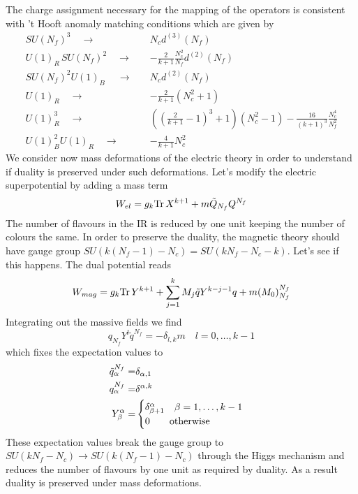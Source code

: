 The charge assignment necessary for the mapping of the operators is consistent with 't Hooft anomaly matching conditions which are given by
\begin{equation}
\begin{aligned}
SU(N_f)^3 \quad \longrightarrow \quad   & N_c d^{(3)}(N_f) \\
U(1)_R\, SU(N_f)^2 \quad \longrightarrow \quad  & -\frac{2}{k+1} \frac{N_c^2}{N_f} d^{(2)} (N_f) \\
SU(N_f)^2 U(1)_B\ \quad \longrightarrow \quad  & N_c d^{(2)}(N_f) \\
U(1)_R \quad \longrightarrow \quad  & - \frac{2}{k+1} (N_c^2 + 1) \\
U(1)_R^3 \quad \longrightarrow \quad  & \left( \left(\frac{2}{k+1} -1 \right)^3 +1 \right) (N_c^2-1) - \frac{16}{(k+1)^3} \frac{N_c^4}{N_f^2} \\
U(1)_B^2 U(1)_R \quad \longrightarrow \quad  & - \frac{4}{k+1} N_c^2
\end{aligned}
\end{equation}
We consider now mass deformations of the electric theory in order to understand if duality is preserved under such deformations.
Let's modify the electric superpotential by adding a mass term
\begin{equation}
W_{el} =  g_k \mathrm{Tr } \, X^{k+1} + m \tilde{Q}_{N_f} Q^{N_f}
\end{equation}
The number of flavours in the IR is reduced by one unit keeping the number of colours the same. 
In order to preserve the duality, the magnetic theory should have gauge group $SU( k (N_f - 1) - N_c) = SU(k N_f - N_c - k)$.
Let's see if this happens.
The dual potential reads
\begin{equation}
W_{mag} = g_k \mathrm{Tr } \, Y^{k+1} + \sum_{j=1}^k M_j \tilde{q} Y^{k-j-1} q + m (M_0)^{N_f}_{N_f}
\end{equation}
Integrating out the massive fields we find 
\begin{equation}
 q_{N_f} Y^{l} \tilde{q}^{N_f} = - \delta_{l,k} m \quad l=0,\dotsc, k-1
\end{equation}
which fixes the expectation values to
\begin{equation}
\begin{aligned}
\tilde{q}_{\alpha}^{N_f} = & \delta_{\alpha,1} \\
q_{\alpha}^{N_f} = & \delta^{\alpha,k}\\
Y^{\alpha}_{\beta} = & 
	\begin{cases}
		\delta_{\beta+1}^{\alpha} \quad \beta = 1 , \dotsc, k-1 \\
		0 \qquad \hbox{otherwise}
	\end{cases}
\end{aligned}
\end{equation}
These expectation values break the gauge group to $SU(k N_f - N_c) \rightarrow SU( k (N_f -1) - N_c) $ through the Higgs mechanism and reduces the number of flavours by one unit as required by duality.
As a result duality is preserved under mass deformations.
